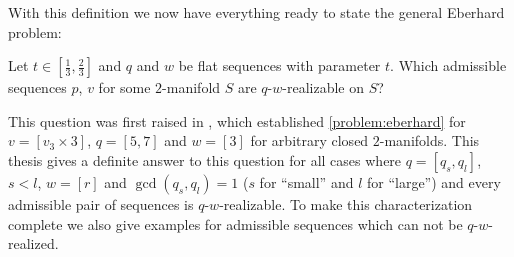 With this definition we now have everything ready to state the general {\sc Eberhard} problem:

\begin{problem}\label{problem:eberhard}
  Let $ t \in \left[\frac{1}{3}, \frac{2}{3}\right]$ and $q$ and $w$ be flat sequences with parameter $t$. Which admissible sequences $p$, $v$ for some $2$-manifold $S$ are $q$-$w$-realizable on $S$?
\end{problem}

This question was first raised in \cite{devos2010eberhard}, which established \autoref{problem:eberhard} for $v = [v_3 \times 3]$, $q = [5, 7]$ and $w = [3]$ for arbitrary closed $2$-manifolds. This thesis gives a definite answer to this question for all cases where $q = [q_s, q_l]$, $s < l$, $w = [r]$ and $\gcd(q_s, q_l) = 1$ ($s$ for ``small'' and $l$ for ``large'') and every admissible pair of sequences is $q$-$w$-realizable. To make this characterization complete we also give examples for admissible sequences which can not be $q$-$w$-realized.

